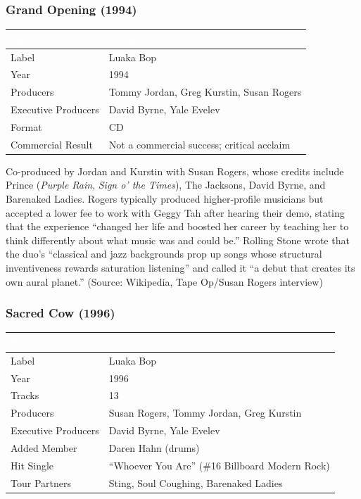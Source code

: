 \documentclass[11pt,letterpaper]{article}
\newcommand{\tableheader}[1]{\textbf{\sffamily\textcolor{white}{#1}}}
\begin{document}
\subsubsection{Grand Opening (1994)}

\begin{center}
\begin{tabularx}{\textwidth}{L{3cm}X}
\toprule
{}
\tableheader{Field} & \tableheader{Detail} \\
\midrule
Label & Luaka Bop \\
Year & 1994 \\
Producers & Tommy Jordan, Greg Kurstin, Susan Rogers \\
Executive Producers & David Byrne, Yale Evelev \\
Format & CD \\
Commercial Result & Not a commercial success; critical acclaim \\
\bottomrule
\end{tabularx}
\end{center}

Co-produced by Jordan and Kurstin with Susan Rogers, whose credits include Prince (\textit{Purple Rain}, \textit{Sign o' the Times}), The Jacksons, David Byrne, and Barenaked Ladies. Rogers typically produced higher-profile musicians but accepted a lower fee to work with Geggy Tah after hearing their demo, stating that the experience ``changed her life and boosted her career by teaching her to think differently about what music was and could be.'' Rolling Stone wrote that the duo's ``classical and jazz backgrounds prop up songs whose structural inventiveness rewards saturation listening'' and called it ``a debut that creates its own aural planet.'' (Source: Wikipedia, Tape Op/Susan Rogers interview)

\subsubsection{Sacred Cow (1996)}

\begin{center}
\begin{tabularx}{\textwidth}{L{3cm}X}
\toprule
{}
\tableheader{Field} & \tableheader{Detail} \\
\midrule
Label & Luaka Bop \\
Year & 1996 \\
Tracks & 13 \\
Producers & Susan Rogers, Tommy Jordan, Greg Kurstin \\
Executive Producers & David Byrne, Yale Evelev \\
Added Member & Daren Hahn (drums) \\
Hit Single & ``Whoever You Are'' (\#16 Billboard Modern Rock) \\
Tour Partners & Sting, Soul Coughing, Barenaked Ladies \\
\bottomrule
\end{tabularx}
\end{center}
\end{document}
